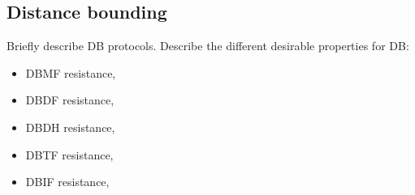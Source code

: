 \subsection{Distance bounding}%
\label{DistanceBounding}

Briefly describe \ac{DB} protocols.
Describe the different desirable properties for \ac{DB}:
\begin{itemize}
  \item \ac{DBMF} resistance,
  \item \ac{DBDF} resistance,
  \item \ac{DBDH} resistance,
  \item \ac{DBTF} resistance,
  \item \ac{DBIF} resistance,
\end{itemize}


